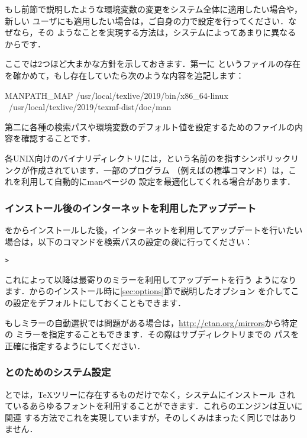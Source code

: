 \documentclass[uplatex,dvipdfmx]{jsarticle}
\begin{document}
もし前節で説明したような環境変数の変更をシステム全体に適用したい場合や，新しい
ユーザにも適用したい場合は，ご自身の力で設定を行ってください．なぜなら，その
ようなことを実現する方法は，システムによってあまりに異なるからです．

ここでは2つほど大まかな方針を示しておきます．第一に%
というファイルの存在を確かめて，もし存在していたら次のような内容を追記します：
%
\begin{sverbatim}
MANPATH_MAP /usr/local/texlive/2019/bin/x86_64-linux \
            /usr/local/texlive/2019/texmf-dist/doc/man
\end{sverbatim}
%
第二に各種の検索パスや環境変数のデフォルト値を設定するためのファイルの内容を確認することです．

各UNIX向けのバイナリディレクトリには，という名前のを指すシンボリックリンクが作成されています．一部のプログラム
（例えば\macOS の標準コマンド）は，これを利用して自動的にmanページの
設定を最適化してくれる場合があります．

\subsubsection{\DVD インストール後のインターネットを利用したアップデート}
\label{sec:dvd-install-net-updates}

\TL を\DVD からインストールした後，インターネットを利用してアップデートを行いたい
場合は，以下のコマンドを検索パスの設定の\emph{後}に行ってください：
%
\begin{alltt}
> 
\end{alltt}
%
これによって以降は最寄りの\CTAN ミラーを利用してアップデートを行う
ようになります．\DVD からのインストール時に\ref{sec:options}節で説明したオプション
を介してこの設定をデフォルトにしておくこともできます．

もしミラーの自動選択では問題がある場合は，\url{http://ctan.org/mirrors}から特定の
\CTAN ミラーを指定することもできます．その際はサブディレクトリまでの
パスを正確に指定するようにしてください．

\subsubsection{\XeTeX と\LuaTeX のためのシステム設定}
\label{sec:font-conf-sys}

\XeTeX と\LuaTeX では，\TeX ツリーに存在するものだけでなく，システムにインストール
されているあらゆるフォントを利用することができます．これらのエンジンは互いに関連
する方法でこれを実現していますが，そのしくみはまったく同じではありません．
\end{document}
